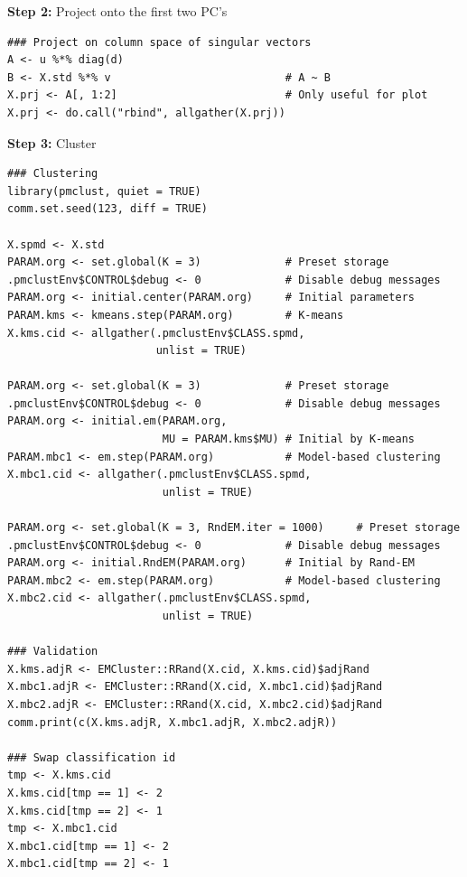 \textbf{Step 2:}  Project onto the first two PC's\vspace{-.6cm}
\begin{lstlisting}[language=rr]
### Project on column space of singular vectors
A <- u %*% diag(d)
B <- X.std %*% v                           # A ~ B 
X.prj <- A[, 1:2]                          # Only useful for plot
X.prj <- do.call("rbind", allgather(X.prj))
\end{lstlisting}

\textbf{Step 3:}  Cluster\vspace{-.6cm}
\begin{lstlisting}[language=rr]
### Clustering
library(pmclust, quiet = TRUE)
comm.set.seed(123, diff = TRUE)

X.spmd <- X.std
PARAM.org <- set.global(K = 3)             # Preset storage
.pmclustEnv$CONTROL$debug <- 0             # Disable debug messages
PARAM.org <- initial.center(PARAM.org)     # Initial parameters
PARAM.kms <- kmeans.step(PARAM.org)        # K-means
X.kms.cid <- allgather(.pmclustEnv$CLASS.spmd,
                       unlist = TRUE)

PARAM.org <- set.global(K = 3)             # Preset storage
.pmclustEnv$CONTROL$debug <- 0             # Disable debug messages
PARAM.org <- initial.em(PARAM.org,
                        MU = PARAM.kms$MU) # Initial by K-means
PARAM.mbc1 <- em.step(PARAM.org)           # Model-based clustering
X.mbc1.cid <- allgather(.pmclustEnv$CLASS.spmd,
                        unlist = TRUE)

PARAM.org <- set.global(K = 3, RndEM.iter = 1000)     # Preset storage
.pmclustEnv$CONTROL$debug <- 0             # Disable debug messages
PARAM.org <- initial.RndEM(PARAM.org)      # Initial by Rand-EM
PARAM.mbc2 <- em.step(PARAM.org)           # Model-based clustering
X.mbc2.cid <- allgather(.pmclustEnv$CLASS.spmd,
                        unlist = TRUE)

### Validation
X.kms.adjR <- EMCluster::RRand(X.cid, X.kms.cid)$adjRand
X.mbc1.adjR <- EMCluster::RRand(X.cid, X.mbc1.cid)$adjRand
X.mbc2.adjR <- EMCluster::RRand(X.cid, X.mbc2.cid)$adjRand
comm.print(c(X.kms.adjR, X.mbc1.adjR, X.mbc2.adjR))

### Swap classification id
tmp <- X.kms.cid
X.kms.cid[tmp == 1] <- 2
X.kms.cid[tmp == 2] <- 1
tmp <- X.mbc1.cid
X.mbc1.cid[tmp == 1] <- 2
X.mbc1.cid[tmp == 2] <- 1
\end{lstlisting}

